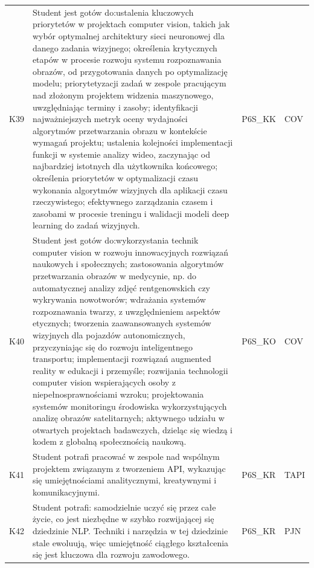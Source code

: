 \documentclass[12pt,a4paper]{article}
\begin{document}
{\begin{longtable}{m{1cm}m{8.8cm}m{2.1cm}m{2.5cm}}
\rowcolor{tableRowLight} K39 & Student jest gotów do:ustalenia kluczowych priorytetów w projektach computer vision, takich jak wybór optymalnej architektury sieci neuronowej dla danego zadania wizyjnego; określenia krytycznych etapów w procesie rozwoju systemu rozpoznawania obrazów, od przygotowania danych po optymalizację modelu; priorytetyzacji zadań w zespole pracującym nad złożonym projektem widzenia maszynowego, uwzględniając terminy i zasoby; identyfikacji najważniejszych metryk oceny wydajności algorytmów przetwarzania obrazu w kontekście wymagań projektu; ustalenia kolejności implementacji funkcji w systemie analizy wideo, zaczynając od najbardziej istotnych dla użytkownika końcowego; określenia priorytetów w optymalizacji czasu wykonania algorytmów wizyjnych dla aplikacji czasu rzeczywistego; efektywnego zarządzania czasem i zasobami w procesie treningu i walidacji modeli deep learning do zadań wizyjnych. & {\scriptsize P6S\_KK} & {\scriptsize COV} \\
\rowcolor{tableRowAlt} K40 & Student jest gotów do:wykorzystania technik computer vision w rozwoju innowacyjnych rozwiązań naukowych i społecznych; zastosowania algorytmów przetwarzania obrazów w medycynie, np. do automatycznej analizy zdjęć rentgenowskich czy wykrywania nowotworów; wdrażania systemów rozpoznawania twarzy, z uwzględnieniem aspektów etycznych; tworzenia zaawansowanych systemów wizyjnych dla pojazdów autonomicznych, przyczyniając się do rozwoju inteligentnego transportu; implementacji rozwiązań augmented reality w edukacji i przemyśle; rozwijania technologii computer vision wspierających osoby z niepełnosprawnościami wzroku; projektowania systemów monitoringu środowiska wykorzystujących analizę obrazów satelitarnych; aktywnego udziału w otwartych projektach badawczych, dzieląc się wiedzą i kodem z globalną społecznością naukową. & {\scriptsize P6S\_KO} & {\scriptsize COV} \\
\rowcolor{tableRowLight} K41 & Student potrafi pracować w zespole nad wspólnym projektem związanym z tworzeniem API, wykazując się umiejętnościami analitycznymi, kreatywnymi i komunikacyjnymi. & {\scriptsize P6S\_KR} & {\scriptsize TAPI} \\
\rowcolor{tableRowAlt} K42 & Student potrafi: samodzielnie uczyć się przez całe życie, co jest niezbędne w szybko rozwijającej się dziedzinie NLP. Techniki i narzędzia w tej dziedzinie stale ewoluują, więc umiejętność ciągłego kształcenia się jest kluczowa dla rozwoju zawodowego. & {\scriptsize P6S\_KR} & {\scriptsize PJN} \\

\end{longtable}}
\end{document}
